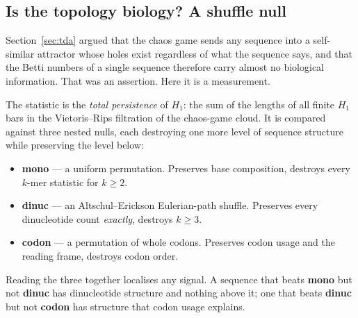 \subsection{Is the topology biology? A shuffle null}\label{sub:tdanull}

Section~\ref{sec:tda} argued that the chaos game sends any sequence into a
self-similar attractor whose holes exist regardless of what the sequence says,
and that the Betti numbers of a single sequence therefore carry almost no
biological information. That was an assertion. Here it is a measurement.

\begin{model}\label{model:tdanull}
The statistic is the \emph{total persistence} of $H_1$: the sum of the lengths of
all finite $H_1$ bars in the Vietoris--Rips filtration of the chaos-game cloud.
It is compared against three nested nulls, each destroying one more level of
sequence structure while preserving the level below:
\begin{itemize}[leftmargin=*,itemsep=1pt,topsep=1pt]
  \item \textbf{mono} --- a uniform permutation. Preserves base composition,
        destroys every $k$-mer statistic for $k \ge 2$.
  \item \textbf{dinuc} --- an Altschul--Erickson Eulerian-path shuffle. Preserves
        every dinucleotide count \emph{exactly}, destroys $k \ge 3$.
  \item \textbf{codon} --- a permutation of whole codons. Preserves codon usage
        and the reading frame, destroys codon order.
\end{itemize}
\end{model}

Reading the three together localises any signal. A sequence that beats
\textbf{mono} but not \textbf{dinuc} has dinucleotide structure and nothing
above it; one that beats \textbf{dinuc} but not \textbf{codon} has structure that
codon usage explains.

